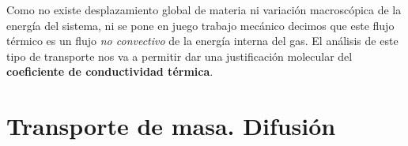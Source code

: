 \documentclass[12pt]{book}
\begin{document}
Como no existe desplazamiento global de materia ni variación macroscópica de la energía del sistema, ni se pone en juego trabajo mecánico decimos que este flujo térmico es un flujo \textit{no convectivo} de la energía interna del gas. El análisis de este tipo de transporte nos va a permitir dar una justificación molecular del \textbf{coeficiente de conductividad térmica}. 

\section{Transporte de masa. Difusión}
\end{document}
